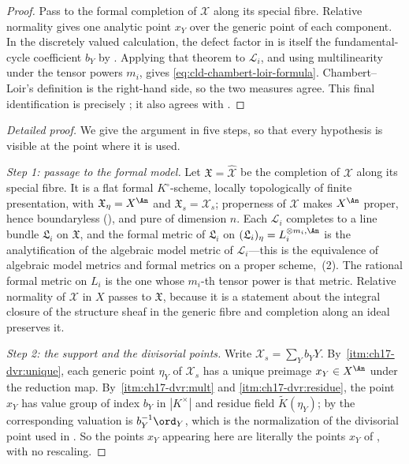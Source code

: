 \begin{proof}
Pass to the formal completion of $\mathcal X$ along its special fibre.
Relative normality gives one analytic point $x_Y$ over the generic point of
each component.  In the discretely valued calculation, the defect factor in
 is itself the fundamental-cycle
coefficient $b_Y$ by .  Applying
that theorem to $\mathcal L_i$, and using multilinearity under the tensor
powers $m_i$, gives \eqref{eq:cld-chambert-loir-formula}.  Chambert--Loir's
definition is the right-hand side, so the two measures agree.  This final
identification is precisely \cite[Proposition~18.5.8]{CLD25}; it also agrees
with \cite{CL06}.
\end{proof}

\begin{proof}[Detailed proof]
We give the argument in five steps, so that every hypothesis is visible at
the point where it is used.

\emph{Step 1: passage to the formal model.}  Let
$\mathfrak X=\widehat{\mathcal X}$ be the completion of $\mathcal X$
along its special fibre.  It is a flat formal $K^\circ$-scheme, locally
topologically of finite presentation, with
$\mathfrak X_\eta=X^{\An}$ and $\mathfrak X_s=\mathcal X_s$; properness
of $\mathcal X$ makes $X^{\An}$ proper, hence boundaryless
(), and pure of dimension $n$.  Each
$\mathcal L_i$ completes to a line bundle $\mathfrak L_i$ on
$\mathfrak X$, and the formal metric of $\mathfrak L_i$ on
$(\mathfrak L_i)_\eta=L_i^{\otimes m_i,\An}$ is the analytification of the
algebraic model metric of $\mathcal L_i$---this is the equivalence of
algebraic model metrics and formal metrics on a proper scheme,
\,(2).  The rational formal metric on
$L_i$ is the one whose $m_i$-th tensor power is that metric.  Relative
normality of $\mathcal X$ in $X$ passes to $\mathfrak X$, because it
is a statement about the integral closure of the structure sheaf in the
generic fibre and completion along an ideal preserves it.

\emph{Step 2: the support and the divisorial points.}  Write
$\mathcal X_s=\sum_Yb_YY$.  By
\,\cref{itm:ch17-dvr:unique}, each generic point
$\eta_Y$ of $\mathcal X_s$ has a unique preimage $x_Y\in X^{\An}$ under
the reduction map.  By
\,\cref{itm:ch17-dvr:mult} and
\cref{itm:ch17-dvr:residue}, the point $x_Y$ has value group of index
$b_Y$ in $|K^\times|$ and residue field $\widetilde K(\eta_Y)$; by
 the corresponding valuation is
$b_Y^{-1}\ord_Y$, which is the normalization of the divisorial point used
in .  So the points $x_Y$ appearing here are
literally the points $x_Y$ of , with no rescaling.


\end{proof}

